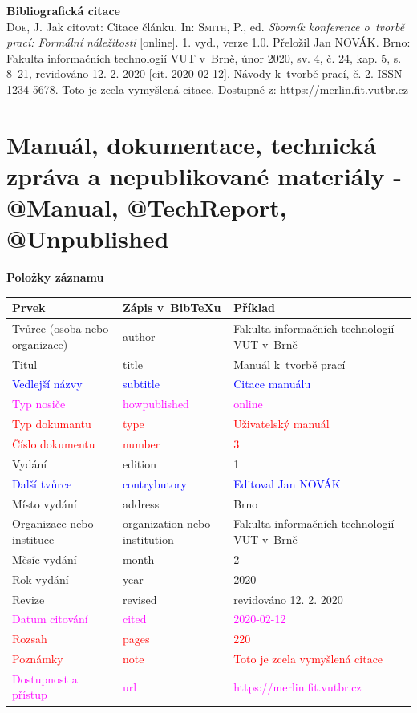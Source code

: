 \bigskip

\noindent \textbf{Bibliografická citace}\\
\textsc{Doe}, J. Jak citovat: Citace článku.
In: \textsc{Smith}, P., ed. \textit{Sborník konference o~tvorbě prací: Formální náležitosti} [online]. 1. vyd., verze 1.0. Přeložil Jan NOVÁK. Brno: Fakulta informačních technologií VUT v~Brně, únor 2020, sv. 4, č. 24, kap. 5, s. 8–21, revidováno 12. 2. 2020 [cit. 2020-02-12]. Návody k~tvorbě prací, č. 2. ISSN 1234-5678. Toto je zcela vymyšlená citace. Dostupné z: \url{https://merlin.fit.vutbr.cz}
\newpage
\section*{Manuál, dokumentace, technická zpráva a nepublikované materiály - @Manual, @TechReport, @Unpublished}
\label{pr-manual}
\noindent \textbf{Položky záznamu}

\medskip

\begin{tabularx}{\linewidth}{X X X}
    Prvek & Zápis v~BibTeXu & Příklad\\\hline
    Tvůrce (osoba nebo organizace) & author & Fakulta informačních technologií VUT v~Brně\\
    Titul & title & Manuál k~tvorbě prací\\
    \textcolor{blue}{Vedlejší názvy} & \textcolor{blue}{subtitle} & \textcolor{blue}{Citace manuálu}\\
    \textcolor{magenta}{Typ nosiče} & \textcolor{magenta}{howpublished} & \textcolor{magenta}{online}\\
    \textcolor{red}{Typ dokumantu} & \textcolor{red}{type} & \textcolor{red}{Uživatelský manuál}\\
    \textcolor{red}{Číslo dokumentu} & \textcolor{red}{number} & \textcolor{red}{3}\\
    Vydání & edition & 1\\
    \textcolor{blue}{Další tvůrce} & \textcolor{blue}{contrybutory} & \textcolor{blue}{Editoval Jan NOVÁK}\\
    Místo vydání & address & Brno\\
    Organizace nebo instituce & organization nebo institution & Fakulta informačních technologií VUT v~Brně\\
    Měsíc vydání & month & 2\\
    Rok vydání & year & 2020\\
    Revize & revised & revidováno 12. 2. 2020\\
    \textcolor{magenta}{Datum citování} & \textcolor{magenta}{cited} & \textcolor{magenta}{2020-02-12}\\
    \textcolor{red}{Rozsah} & \textcolor{red}{pages} & \textcolor{red}{220}\\   
    \textcolor{red}{Poznámky} & \textcolor{red}{note} & \textcolor{red}{Toto je zcela vymyšlená citace}\\
    \textcolor{magenta}{Dostupnost a přístup} & \textcolor{magenta}{url} & \textcolor{magenta}{https://merlin.fit.vutbr.cz}\\
\end{tabularx}

